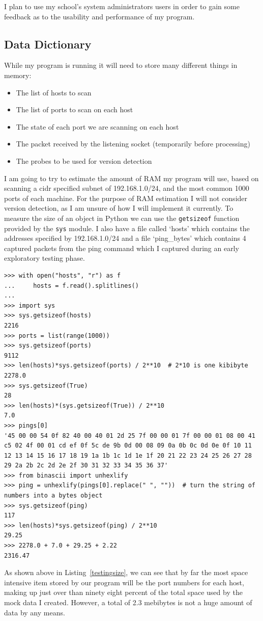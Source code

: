 \documentclass[titlepage]{article}
\let\Oldsubsection\subsection{}
\renewcommand{\subsection}{\FloatBarrier\Oldsubsection}
\begin{document}
I plan to use my school's system administrators users in order to gain some feedback
as to the usability and performance of my program.

\subsection{Data Dictionary}

While my program is running it will need to store many different things in memory:
\begin{itemize}
  \item{The list of hosts to scan}
  \item{The list of ports to scan on each host}
  \item{The state of each port we are scanning on each host}
  \item{The packet received by the listening socket (temporarily before processing)}
  \item{The probes to be used for version detection}
\end{itemize}
I am going to try to estimate the amount of RAM my program will use, based on scanning a 
\gls{cidr} specified subnet of 192.168.1.0/24, and the most common 1000 ports of each machine.
For the purpose of RAM estimation I will not consider version detection, as I am unsure of how I will implement it currently.
To measure the size of an object in Python we can use the \verb|getsizeof| function provided by the
\verb|sys| module. I also have a file called `hosts' which contains the addresses specified by
192.168.1.0/24 and a file `ping\_bytes' which contains 4 captured packets from the ping command
which I captured during an early exploratory testing phase.
\lstset{language=Python}
\begin{lstlisting}[label=testingsize,caption=\textit{Some testing I did on the size of Python objects.}]
>>> with open("hosts", "r") as f
...     hosts = f.read().splitlines()
... 
>>> import sys
>>> sys.getsizeof(hosts)
2216
>>> ports = list(range(1000))
>>> sys.getsizeof(ports)
9112
>>> len(hosts)*sys.getsizeof(ports) / 2**10  # 2*10 is one kibibyte
2278.0
>>> sys.getsizeof(True)
28
>>> len(hosts)*(sys.getsizeof(True)) / 2**10
7.0
>>> pings[0]
'45 00 00 54 0f 82 40 00 40 01 2d 25 7f 00 00 01 7f 00 00 01 08 00 41 c5 02 4f 00 01 cd ef 0f 5c de 9b 0d 00 08 09 0a 0b 0c 0d 0e 0f 10 11 12 13 14 15 16 17 18 19 1a 1b 1c 1d 1e 1f 20 21 22 23 24 25 26 27 28 29 2a 2b 2c 2d 2e 2f 30 31 32 33 34 35 36 37'
>>> from binascii import unhexlify
>>> ping = unhexlify(pings[0].replace(" ", ""))  # turn the string of numbers into a bytes object
>>> sys.getsizeof(ping)
117
>>> len(hosts)*sys.getsizeof(ping) / 2**10
29.25
>>> 2278.0 + 7.0 + 29.25 + 2.22
2316.47
\end{lstlisting}
As shown above in Listing~\ref{testingsize}, we can see that by far the most space intensive item stored
by our program will be the port numbers for each host, making up just over than ninety eight percent
of the total space used by the mock data I created. However, a total of 2.3 mebibytes is not a huge
amount of data by any means.
\end{document}
